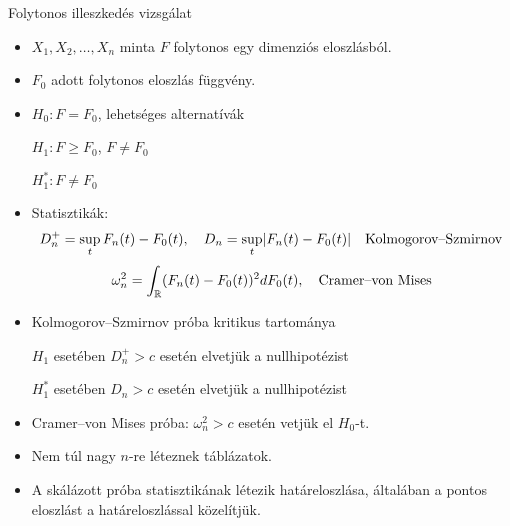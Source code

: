 \documentclass[aspectratio=169,notheorems,9pt,\option]{beamer}
\begin{document}
\begin{frame}{Folytonos illeszkedés vizsgálat}
  \begin{itemize}
    \item $X_1,X_2,\dots,X_n$ minta  $F$ folytonos egy dimenziós
    eloszlásból.
    \item $F_0$ adott folytonos eloszlás függvény.
    \item $H_0: F=F_0$, lehetséges alternatívák
    
    $H_1:F\geq F_0$, $F \neq F_0$ %
    
    $H^*_1:F\neq F_0$ %
    \item Statisztikák:
    \begin{displaymath}
      D_n^+=\sup_t F_n (t)-F_0 (t),\quad D_n=\sup_t\abs*{F_n (t)-F_0 (t)}\quad\text{Kolmogorov--Szmirnov}
    \end{displaymath}
    \begin{displaymath}
      \omega^2_n=\int_{\mathbb{R}} (F_n (t)-F_0 (t))^2 dF_0 (t),
      \quad\text{Cramer--von Mises}
    \end{displaymath}
    
    \item Kolmogorov--Szmirnov próba kritikus tartománya
    
    $H_1$ esetében $D_n^+>c$ esetén elvetjük a nullhipotézist
    
    $H^*_1$ esetében $D_n>c$ esetén elvetjük a nullhipotézist
    
    \item Cramer--von Mises próba:  $\omega^2_n>c$ esetén vetjük el $H_0$-t.
    
    \item Nem túl nagy $n$-re léteznek táblázatok. 
    \item A skálázott próba statisztikának létezik határeloszlása,
    általában a pontos eloszlást a határeloszlással közelítjük.
  \end{itemize}
\end{frame}
\end{document}
